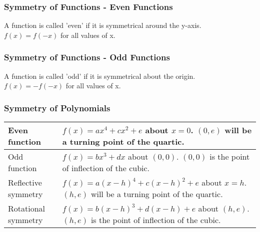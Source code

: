 \documentclass{article}
\begin{document}
			\subsubsection{Symmetry of Functions - Even Functions}
				A function is called 'even' if it is symmetrical around the y-axis. $f(x)=f(-x)$ for all values of x.
				\begin{center}
				\end{center}
			\subsubsection{Symmetry of Functions - Odd Functions}
				A function is called 'odd' if it is symmetrical about the origin. $f(x)=-f(-x)$ for all values of x.
				\begin{center}
				\end{center}
			\subsubsection{Symmetry of Polynomials}
				\begin{tabular}{|p{3cm}|p{10cm}|}
					\hline
					Even function & $f(x)=ax^4 + cx^2 + e$ about $x=0$. $(0,e)$ will be a turning point of the quartic. \\
					\hline
					Odd function & $f(x)=bx^3 + dx$ about $(0,0)$. $(0,0)$ is the point of inflection of the cubic. \\
					\hline\hline
					Reflective symmetry & $f(x)=a(x-h)^4+c(x-h)^2+e$ about $x=h$. $(h,e)$ will be a turning point of the quartic. \\
					\hline
					Rotational symmetry & $f(x)=b(x-h)^3+d(x-h)+e$ about $(h,e)$. $(h,e)$ is the point of inflection of the cubic.\\
					\hline
				\end{tabular}
\end{document}
